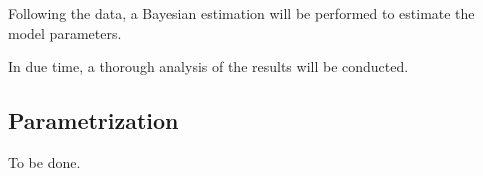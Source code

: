 \documentclass[
thesis.tex
]{subfiles}
\begin{document}
	Following the data, a Bayesian estimation will be performed to estimate the model parameters.
	
	In due time, a thorough analysis of the results will be conducted.
	
\subsection{Parametrization}
	
	To be done.
\end{document}
